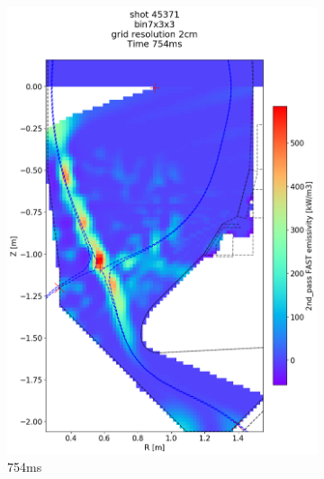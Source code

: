 \begin{figure}[!ht]
\begin{subfigure}{0.395\linewidth}
         \includegraphics[trim={75 40 0 190},clip,width=\textwidth]{Chapters/chapter2/figs/IRVB-MASTU_shot-45371_export_10.png}
         \vspace*{-6.5mm}
         \caption{754ms}
         \label{fig:45371_export2_3}
     \end{subfigure}
     \begin{subfigure}{0.395\linewidth}
         \centering

\end{subfigure}
\end{figure}
